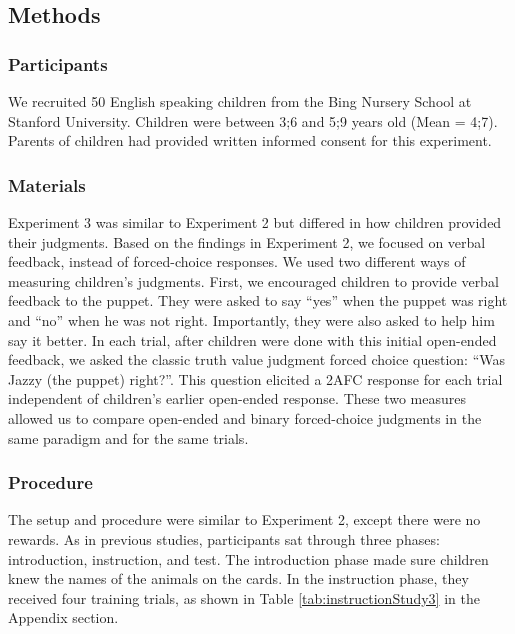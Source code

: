 \documentclass[
  english,
  ,man,floatsintext]{apa6}
\begin{document}
\hypertarget{methods-2}{%
\subsection{Methods}\label{methods-2}}

\hypertarget{participants-2}{%
\subsubsection{Participants}\label{participants-2}}

We recruited 50 English speaking children from the Bing Nursery School at Stanford University. Children were between 3;6 and 5;9 years old (Mean = 4;7). Parents of children had provided written informed consent for this experiment.

\hypertarget{materials-1}{%
\subsubsection{Materials}\label{materials-1}}

Experiment 3 was similar to Experiment 2 but differed in how children provided their judgments. Based on the findings in Experiment 2, we focused on verbal feedback, instead of forced-choice responses. We used two different ways of measuring children's judgments. First, we encouraged children to provide verbal feedback to the puppet. They were asked to say \enquote{yes} when the puppet was right and \enquote{no} when he was not right. Importantly, they were also asked to help him say it better. In each trial, after children were done with this initial open-ended feedback, we asked the classic truth value judgment forced choice question: \enquote{Was Jazzy (the puppet) right?}. This question elicited a 2AFC response for each trial independent of children's earlier open-ended response. These two measures allowed us to compare open-ended and binary forced-choice judgments in the same paradigm and for the same trials.

\hypertarget{procedure-2}{%
\subsubsection{Procedure}\label{procedure-2}}

The setup and procedure were similar to Experiment 2, except there were no rewards. As in previous studies, participants sat through three phases: introduction, instruction, and test. The introduction phase made sure children knew the names of the animals on the cards. In the instruction phase, they received four training trials, as shown in Table \ref{tab:instructionStudy3} in the Appendix section.
\end{document}
